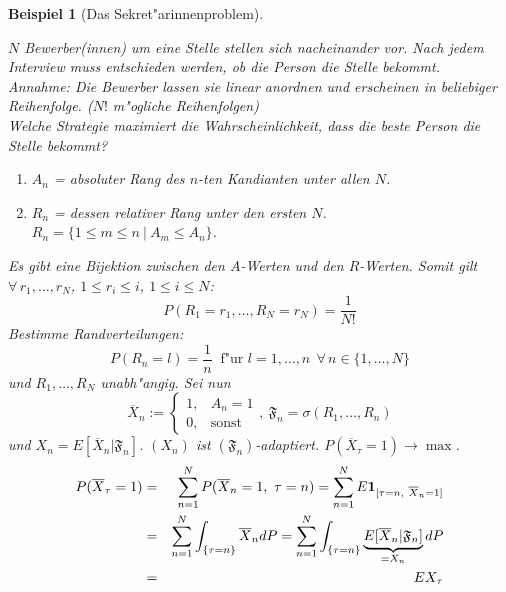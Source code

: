 \documentclass[a4paper,11pt]{scrbook}
\newcommand{\ind}{\text{\bf{1}}}
\def\FF{ \mathfrak{F} }
\newtheorem{Bsp}{Beispiel}[chapter]
\theoremstyle{nonumberplain}
\begin{document}

\begin{Bsp}[Das Sekret"arinnenproblem] \label{Bsp8.8}

$N$ Bewerber(innen) um eine Stelle stellen sich nacheinander vor. Nach jedem Interview muss entschieden werden, ob die Person die Stelle bekommt.\\
Annahme: Die Bewerber lassen sie linear anordnen und erscheinen in beliebiger Reihenfolge. ($N!$ m"ogliche Reihenfolgen)\\
Welche Strategie maximiert die Wahrscheinlichkeit, dass die beste Person die Stelle bekommt?
\begin{enumerate}
\item[$\bullet$] $A_n$ = absoluter Rang des $n$-ten Kandianten unter allen $N$.

\item[$\bullet$] $R_n$ = dessen relativer Rang unter den ersten $N$. $R_n = \{1 \leq m \leq n\ |\ A_m \leq A_n\}$.
\end{enumerate}

Es gibt eine Bijektion zwischen den $A$-Werten und den $R$-Werten. Somit gilt $\forall\, r_1,\dots,r_N$, $1 \leq r_i \leq i$, $1 \leq i \leq N$:
\[
P(R_1 = r_1,\dots,R_N = r_N) = \frac1{N!}
\]
Bestimme Randverteilungen:
\[
P(R_n = l) = \frac1{n}\ \text{ f"ur } l = 1,\dots,n\ \ \forall\, n \in \{1,\dots,N\}
\]
und $R_1,\dots,R_N$ unabh"angig. Sei nun
\[
\overline{X}_n := \begin{cases}
1, & A_n = 1 \\
0, & \text{sonst}
\end{cases},\ \FF_n = \sigma(R_1,\dots,R_n)
\]
und $X_n = E[\overline{X}_n|\FF_n]$. $(X_n)$ ist $(\FF_n)$-adaptiert. $P(\overline{X}_{\tau} = 1) \rightarrow \max$.
\begin{eqnarray*}
P(\overline{X}_{\tau} = 1) & = & \sum_{n=1}^N P(\overline{X}_n = 1,\ \tau=n) = \sum_{n=1}^N E \ind_{[\tau=n,\ \overline{X}_n=1]} \\
& = & \sum_{n=1}^N \int_{\{\tau=n\}} \overline{X}_n dP = \sum_{n=1}^N \int_{\{\tau=n\}} \underbrace{E[\overline{X}_n|\FF_n]}_{=X_n} dP \\
& = & EX_{\tau}
\end{eqnarray*}


\end{Bsp}
\end{document}
